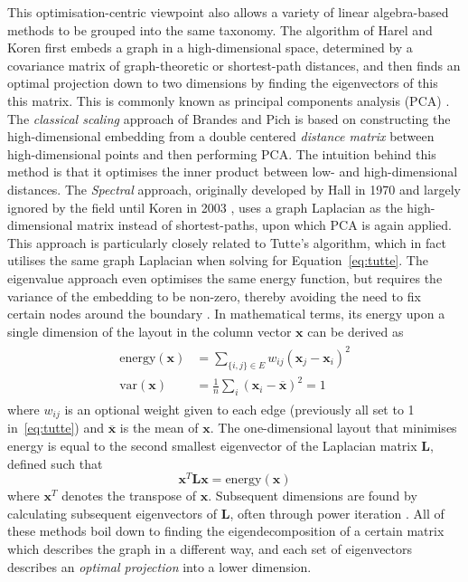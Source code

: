 This optimisation-centric viewpoint also allows a variety of linear algebra-based methods to be grouped into the same taxonomy.
The algorithm of Harel and Koren \cite{Harel2004} first embeds a graph in a high-dimensional space, determined by a covariance matrix of graph-theoretic or shortest-path distances, and then finds an optimal projection down to two dimensions by finding the eigenvectors of this this matrix. This is commonly known as principal components analysis (PCA) \cite{Pearson1901}.
The \emph{classical scaling} approach of Brandes and Pich \cite{Brandes2007Eigensolver} is based on constructing the high-dimensional embedding from a double centered \emph{distance matrix} between high-dimensional points and then performing PCA. The intuition behind this method is that it optimises the inner product between low- and high-dimensional distances.
The \emph{Spectral} approach, originally developed by Hall in 1970 \cite{Hall1970} and largely ignored by the field until Koren in 2003 \cite{Koren2003}, uses a graph Laplacian as the high-dimensional matrix instead of shortest-paths, upon which PCA is again applied. This approach is particularly closely related to Tutte's algorithm, which in fact utilises the same graph Laplacian when solving for Equation~\eqref{eq:tutte}.
The eigenvalue approach even optimises the same energy function, but requires the variance of the embedding to be non-zero, thereby avoiding the need to fix certain nodes around the boundary \cite{Koren2003}.
In mathematical terms, its energy upon a single dimension of the layout in the column vector $\mathbf{x}$ can be derived as
\begin{align}
\begin{split}
  \mathrm{energy}(\mathbf{x}) &= \sum_{\{i,j\}\in E}w_{ij}(\mathbf{x}_j-\mathbf{x}_i)^2\\
  \mathrm{var}(\mathbf{x}) &= \frac{1}{n}\sum_i(\mathbf{x}_i-\overline{\mathbf{x}})^2 = 1
\end{split}
\label{eq:spectral}
\end{align}
where $w_{ij}$ is an optional weight given to each edge (previously all set to 1 in~\eqref{eq:tutte}) and $\overline{\mathbf{x}}$ is the mean of $\mathbf{x}$. The one-dimensional layout that minimises energy is equal to the second smallest eigenvector of the Laplacian matrix $\mathbf{L}$, defined such that
\begin{equation}
  \mathbf{x}^T\mathbf{Lx} = \mathrm{energy}(\mathbf{x})
\end{equation}
where $\mathbf{x}^T$ denotes the transpose of $\mathbf{x}$. Subsequent dimensions are found by calculating subsequent eigenvectors of $\mathbf{L}$, often through power iteration \cite{Koren2003}.
All of these methods boil down to finding the eigendecomposition of a certain matrix which describes the graph in a different way, and each set of eigenvectors describes an \emph{optimal projection} into a lower dimension.

